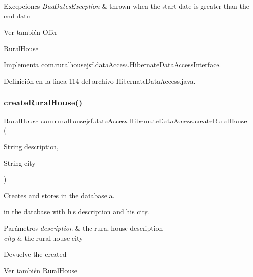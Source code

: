 \begin{DoxyExceptions}{Excepciones}
{\em Bad\+Dates\+Exception} & thrown when the start date is greater than the end date\\
\hline
\end{DoxyExceptions}
\begin{DoxySeeAlso}{Ver también}
Offer 

Rural\+House 
\end{DoxySeeAlso}


Implementa \mbox{\hyperlink{interfacecom_1_1ruralhousejsf_1_1data_access_1_1_hibernate_data_access_interface_a31f9cb8a3c8f0b42dee19b03f052cd62}{com.\+ruralhousejsf.\+data\+Access.\+Hibernate\+Data\+Access\+Interface}}.



Definición en la línea 114 del archivo Hibernate\+Data\+Access.\+java.

\mbox{\label{classcom_1_1ruralhousejsf_1_1data_access_1_1_hibernate_data_access_a23eafc2c1f43052f2005a863d6592abc}} 
\subsubsection{\texorpdfstring{createRuralHouse()}{createRuralHouse()}}
{\footnotesize\ttfamily \mbox{\hyperlink{classcom_1_1ruralhousejsf_1_1domain_1_1_rural_house}{Rural\+House}} com.\+ruralhousejsf.\+data\+Access.\+Hibernate\+Data\+Access.\+create\+Rural\+House (\begin{DoxyParamCaption}\item[{String}]{description,  }\item[{String}]{city }\end{DoxyParamCaption})}



Creates and stores in the database a. 


\begin{DoxyCode}{0}
\end{DoxyCode}
 in the database with his description and his city.


\begin{DoxyParams}{Parámetros}
{\em description} & the rural house description \\
\hline
{\em city} & the rural house city\\
\hline
\end{DoxyParams}
\begin{DoxyReturn}{Devuelve}
the created
\begin{DoxyCode}{0}
\end{DoxyCode}

\end{DoxyReturn}
\begin{DoxySeeAlso}{Ver también}
Rural\+House 
\end{DoxySeeAlso}


